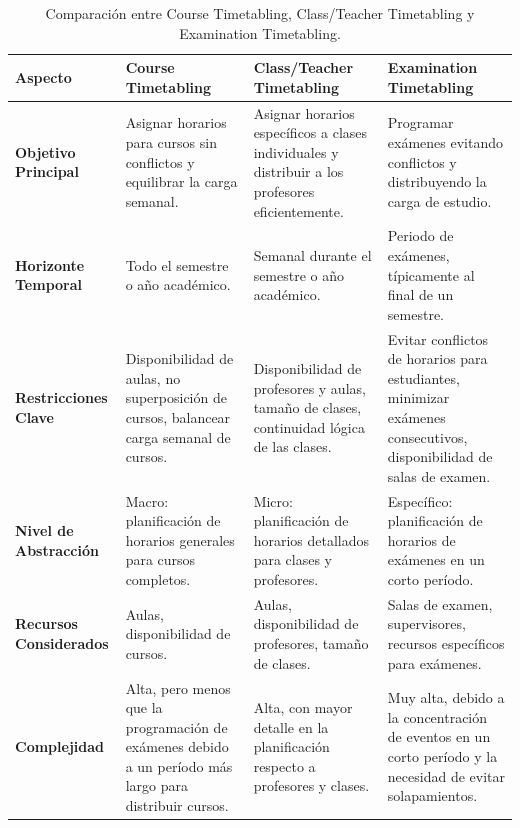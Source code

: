\begin{landscape}
    

\begin{table}[h!]
    \centering
    \renewcommand{\arraystretch}{1.2}
    \begin{tabular}{|p{4cm}|p{4cm}|p{4cm}|p{4cm}|}
    \hline
    \textbf{Aspecto} & \textbf{Course Timetabling} & \textbf{Class/Teacher Timetabling} & \textbf{Examination Timetabling} \\ \hline
    
    \textbf{Objetivo Principal} & 
    Asignar horarios para cursos sin conflictos y equilibrar la carga semanal. & 
    Asignar horarios específicos a clases individuales y distribuir a los profesores eficientemente. & 
    Programar exámenes evitando conflictos y distribuyendo la carga de estudio. \\ \hline
    
    \textbf{Horizonte Temporal} & 
    Todo el semestre o año académico. & 
    Semanal durante el semestre o año académico. & 
    Periodo de exámenes, típicamente al final de un semestre. \\ \hline
    
    \textbf{Restricciones Clave} & 
    Disponibilidad de aulas, no superposición de cursos, balancear carga semanal de cursos. & 
    Disponibilidad de profesores y aulas, tamaño de clases, continuidad lógica de las clases. & 
    Evitar conflictos de horarios para estudiantes, minimizar exámenes consecutivos, disponibilidad de salas de examen. \\ \hline
    
    \textbf{Nivel de Abstracción} & 
    Macro: planificación de horarios generales para cursos completos. & 
    Micro: planificación de horarios detallados para clases y profesores. & 
    Específico: planificación de horarios de exámenes en un corto período. \\ \hline
    
    \textbf{Recursos Considerados} & 
    Aulas, disponibilidad de cursos. & 
    Aulas, disponibilidad de profesores, tamaño de clases. & 
    Salas de examen, supervisores, recursos específicos para exámenes. \\ \hline
    
    \textbf{Complejidad} & 
    Alta, pero menos que la programación de exámenes debido a un período más largo para distribuir cursos. & 
    Alta, con mayor detalle en la planificación respecto a profesores y clases. & 
    Muy alta, debido a la concentración de eventos en un corto período y la necesidad de evitar solapamientos. \\ \hline
    
    \end{tabular}
    \caption{Comparación entre Course Timetabling, Class/Teacher Timetabling y Examination Timetabling.}
    \label{tab:comparison}
    \end{table}
\end{landscape}

